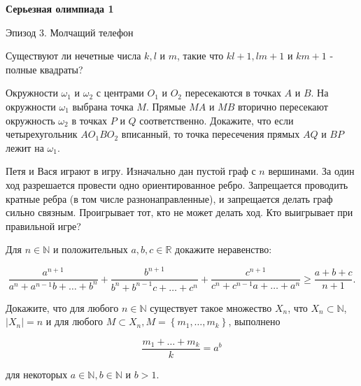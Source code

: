 \centerline{\bf \Huge Серьезная олимпиада 1}

\begin{flushright}
        \scriptsize{Эпизод 3. Молчащий телефон}
\end{flushright}

Существуют ли нечетные числа $k, l$ и $m$, такие что $k l+1, l m+1$ и $k m+1$ - полные квадраты?

Окружности $\omega_1$ и $\omega_2$ с центрами $O_1$ и $O_2$ пересекаются в точках $A$ и $B$. На окружности $\omega_1$ выбрана точка $M$. Прямые $M A$ и $M B$ вторично пересекают окружность $\omega_2$ в точках $P$ и $Q$ соответственно. Докажите, что если четырехугольник $A O_1 B O_2$ вписанный, то точка пересечения прямых $A Q$ и $B P$ лежит на $\omega_1$.

Петя и Вася играют в игру. Изначально дан пустой граф с $n$ вершинами. За один ход разрешается провести одно ориентированное ребро. Запрещается проводить кратные ребра (в том числе разнонаправленные), и запрещается делать граф сильно связным. Проигрывает тот, кто не может делать ход. Кто выигрывает при правильной игре?

Для $n \in \mathbb{N}$ и положительных $a, b, c \in \mathbb{R}$ докажите неравенство:

$$
\frac{a^{n+1}}{a^n+a^{n-1} b+\ldots+b^n}+\frac{b^{n+1}}{b^n+b^{n-1} c+\ldots+c^n}+\frac{c^{n+1}}{c^n+c^{n-1} a+\ldots+a^n} \geqslant \frac{a+b+c}{n+1} .
$$


Докажите, что для любого $n \in \mathbb{N}$ существует такое множество $X_n$, что $X_n \subset \mathbb{N}$, $\left|X_n\right|=n$ и для любого $M \subset X_n, M=\left\{m_1, \ldots, m_k\right\}$, выполнено

$$
\frac{m_1+\ldots+m_k}{k}=a^b
$$


для некоторых $a \in \mathbb{N}, b \in \mathbb{N}$ и $b>1$.